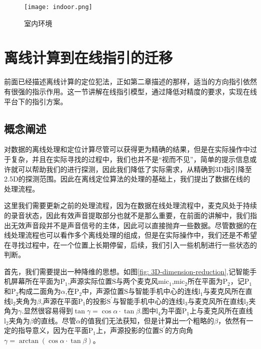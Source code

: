 \documentclass[winfonts,oneside]{njuthesis}
\begin{document}
		\begin{figure}[H]
			\centering
			\texttt{[image: indoor.png]} 
			\caption{{室内环境}}
			\label{fig: indoor}
		\end{figure}
		
	
	\section{离线计算到在线指引的迁移}
		
		前面已经描述离线计算的定位犯法，正如第二章描述的那样，适当的方向指引依然有很强的指示作用。这一节讲解在线指引模型，通过降低对精度的要求，实现在线平台下的指引方案。
	
		\subsection{概念阐述}
			
			对数据的离线处理和定位计算尽管可以获得更为精确的结果，但是在实际操作中过于复杂，并且在实际寻找的过程中，我们也并不是“视而不见”，简单的提示信息或许就可以帮助我们的进行探测，因此我们降低了实际需求，从精确到3D指引降至2.5D的探测范围。因此在离线定位算法的处理的基础上，我们提出了数据在线的处理流程。
		
			这里我们需要更新之前的处理流程，因为在数据在线处理流程中，麦克风处于持续的录音状态，因此有效声音提取部分也就不是那么重要，在前面的讲解中，我们指出无效声音段并不是声音信号的主体，因此可以直接抛弃一些数据。尽管数据的在线处理流程也可以看作多个离线处理的组成，但是在实际操作中，我们还是不希望在寻找过程中，在一个位置上长期停留，后续，我们引入一些机制进行一些状态的判断。
			
			首先，我们需要提出一种降维的思想。如图\ref{fig: 3D-dimension-reduction},记智能手机屏幕所在平面为$\text{P}_1$,声源实际位置$\text{S}$与两个麦克风$\text{mic}_1$,$\text{mic}_2$所在平面为$\text{P}_2$，记$\text{P}_1$和$\text{P}_2$构成二面角为$\alpha$,在$\text{P}_2$中，声源位置$\text{S}$与智能手机中心的连线$\text{l}_1$与麦克风所在直线$\text{l}_2$夹角为$\beta$,声源在平面$\text{P}_1$的投影$\text{S}^{'}$与智能手机中心的连线$\text{l}_3$与麦克风所在直线$\text{l}_2$夹角为$\gamma$.显然很容易得到$\tan \gamma = \cos \alpha \cdot \tan \beta$.图中$\text{l}_4$为平面$\text{P}_1$上与麦克风所在直线$\text{l}_2$夹角为$\beta$的直线。尽管$\alpha$的值我们无法获知，但是计算出一个粗略的$\beta$，依然有一定的指导意义，因为在平面$\text{P}_1$上，声源投影的位置$\text{S}^{'}$的方向角$\gamma = \arctan (\cos \alpha \cdot \tan \beta)$。
			
\end{document}
